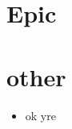 \documentclass{report}
\begin{document}
	\tableofcontents
	\chapter{Epic}
	
	\lipsum[1-9]
	
	\chapter{other}
	\lipsum[6-12]
	
	\begin{itemize}
		\item ok
		\alert yre

	\end{itemize}
\end{document}
